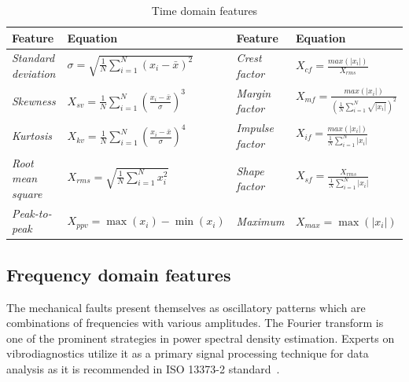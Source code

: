 \begin{table}[h]
\centering
\renewcommand{\arraystretch}{2}
\begin{adjustbox}{width=\columnwidth,center}
\begin{tabular}{|l|l|l|l|}
\hline
\textbf{Feature}            & \textbf{Equation}                                                                    & \textbf{Feature}        & \textbf{Equation}                                                                                                  \\ \hline
\textit{Standard deviation} & $ \sigma = \sqrt{\frac{1}{N}\sum_{i = 1}^{N}{\left(x_i - \bar{x}\right)^2}} $        & \textit{Crest factor}   & $ X_{cf} = \frac{max(|x_i|)}{X_{rms}} $                       \\ \hline
\textit{Skewness}           & $ X_{sv} = \frac{1}{N}\sum_{i = 1}^{N}{\left(\frac{x_i - \bar{x}}{\sigma}\right)^3}$ & \textit{Margin factor}  & $ X_{mf} = \frac{max(|x_i|)}{\left( \frac{1}{N} \sum_{i=1}^{N}{\sqrt{|x_i|}} \right)^2} $                          \\ \hline
\textit{Kurtosis}           & $ X_{kv} = \frac{1}{N}\sum_{i = 1}^{N}{\left(\frac{x_i - \bar{x}}{\sigma}\right)^4}$ & \textit{Impulse factor} & $ X_{if} = \frac{max(|x_i|)}{\frac{1}{N} \sum_{i=1}^{N}{|x_i|}} $                                                  \\ \hline
\textit{Root mean square}   & $ X_{rms} = \sqrt{\frac{1}{N}\sum_{i = 1}^{N}{x_i^2}} $             & \textit{Shape factor}   & $ X_{sf} = \frac{X_{rms}}{\frac{1}{N} \sum_{i=1}^{N}{|x_i|}}$ \\ \hline
\textit{Peak-to-peak}       & $ X_{ppv} = \max(x_i) - \min(x_i) $                                                  & \textit{Maximum}        & $ X_{max} = \max(|x_i|) $                                                                                          \\ \hline
\end{tabular}
\end{adjustbox}
\caption{Time domain features}
\label{tab:td-features}
\end{table}

\subsection{Frequency domain features}
The mechanical faults present themselves as oscillatory patterns which are combinations of frequencies with various amplitudes. The Fourier transform is one of the prominent strategies in power spectral density estimation. Experts on vibrodiagnostics utilize it as a primary signal processing technique for data analysis as it is recommended in ISO 13373-2 standard~\cite{noauthor_iso_2016_2}. 

